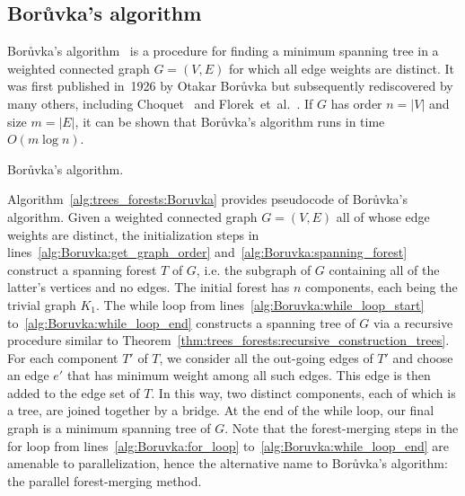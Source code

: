 
\subsection{Bor\r{u}vka's algorithm}
\label{subsec:trees_forests:Boruvka_algorithm}

Bor\r{u}vka's
algorithm~\cite{Boruvka1926a,Boruvka1926b}
is a procedure for finding a minimum
spanning tree in a weighted connected graph $G = (V,E)$ for which all
edge weights are distinct. It was first published in~1926 by Otakar
Bor\r{u}vka but subsequently rediscovered
by many others, including
Choquet~\cite{Choquet1938} and
Florek~et~al.~\cite{FlorekEtAl1951}.
If $G$ has order $n = |V|$ and size $m = |E|$, it can be shown that
Bor\r{u}vka's algorithm runs in time
$O(m \log n)$.

\begin{algorithm}[!htbp]

\caption{Bor\r{u}vka's algorithm.}
\label{alg:trees_forests:Boruvka}
\end{algorithm}

Algorithm~\ref{alg:trees_forests:Boruvka} provides pseudocode of
Bor\r{u}vka's algorithm. Given a
weighted connected graph $G = (V,E)$ all of whose edge weights are
distinct, the initialization steps in
lines~\ref{alg:Boruvka:get_graph_order}
and~\ref{alg:Boruvka:spanning_forest} construct a
spanning forest $T$ of $G$, i.e. the subgraph
of $G$ containing all of the latter's vertices and no edges. The
initial forest has $n$ components, each being the
trivial graph $K_1$. The while loop from
lines~\ref{alg:Boruvka:while_loop_start}
to~\ref{alg:Boruvka:while_loop_end} constructs a spanning tree of $G$
via a recursive procedure similar to
Theorem~\ref{thm:trees_forests:recursive_construction_trees}. For each
component $T'$ of $T$, we consider all the out-going edges of $T'$ and
choose an edge $e'$ that has minimum weight
among all such edges. This edge is then added to the edge set of
$T$. In this way, two distinct components, each of which is a tree,
are joined together by a bridge. At the end of the while
loop, our final graph is a minimum
spanning tree of $G$. Note that the forest-merging steps in the for
loop from lines~\ref{alg:Boruvka:for_loop}
to~\ref{alg:Boruvka:while_loop_end} are amenable to
parallelization, hence the alternative name to
Bor\r{u}vka's algorithm: the parallel
forest-merging method.

